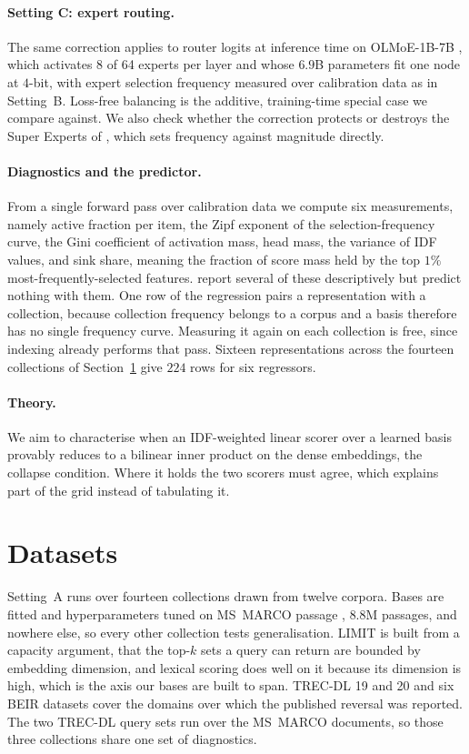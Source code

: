 \documentclass[11pt]{article}
\begin{document}
\paragraph{Setting C: expert routing.} The same correction applies to router logits
at inference time on OLMoE-1B-7B \citep{muennighoff2025olmoe}, which activates 8 of
64 experts per layer and whose $6.9$B parameters fit one node at $4$-bit, with expert
selection frequency measured over calibration data as in Setting~B. Loss-free
balancing \citep{wang2024lossfree} is the additive, training-time special case we
compare against. We also check whether the correction protects or destroys the Super
Experts of \citet{su2026superexperts}, which sets frequency against magnitude
directly.

\paragraph{Diagnostics and the predictor.} From a single forward pass over
calibration data we compute six measurements, namely active fraction per item, the
Zipf exponent of the selection-frequency curve, the Gini coefficient of activation
mass, head mass, the variance of IDF values, and sink share, meaning the fraction
of score mass held by the top $1\%$ most-frequently-selected features.
\citet{han2026bm25v} report several of these descriptively but predict nothing
with them. One row of the regression pairs a representation with a collection,
because collection frequency belongs to a corpus and a basis therefore has no single
frequency curve. Measuring it again on each collection is free, since indexing
already performs that pass. Sixteen representations across the fourteen collections
of Section~\ref{sec:data} give $224$ rows for six regressors.

\paragraph{Theory.} We aim to characterise when an IDF-weighted linear scorer over a
learned basis provably reduces to a bilinear inner product on the dense embeddings,
the collapse condition. Where it holds the two scorers must agree, which explains
part of the grid instead of tabulating it.

\section{Datasets}
\label{sec:data}

Setting~A runs over fourteen collections drawn from twelve corpora. Bases are fitted
and hyperparameters tuned on MS~MARCO passage \citep{bajaj2016msmarco}, $8.8$M
passages, and nowhere else, so every other collection tests generalisation. LIMIT \citep{weller2025limit} is built from a capacity
argument, that the top-$k$ sets a query can return are bounded by embedding
dimension, and lexical scoring does well on it because its dimension is high, which
is the axis our bases are built to span. TREC-DL 19 and 20 and six BEIR datasets
\citep{thakur2021beir} cover the domains over which the published reversal was
reported. The two TREC-DL query sets run over the MS~MARCO documents, so those three
collections share one set of diagnostics.
\end{document}
